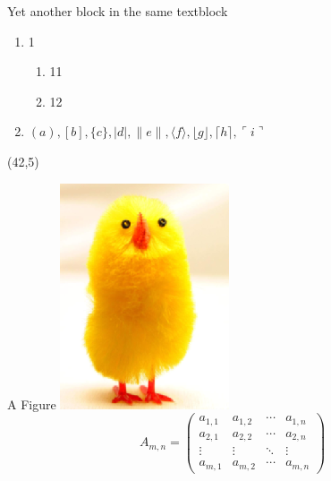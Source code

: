 \documentclass[14pt,final]{beamer}
\begin{document}
\begin{frame}{}
\begin{textblock}{19.3}
\begin{block}{Yet another block in the same textblock}
\begin{enumerate}
\item 1 \cite{latexcompanion}
\begin{enumerate}
\item 11
\item 12
\end{enumerate}
\item $( a ), [ b ], \{ c \}, | d |, \| e \|,
\langle f \rangle, \lfloor g \rfloor,
\lceil h \rceil, \ulcorner i \urcorner$
\end{enumerate}
\end{block}

\end{textblock}


\begin{textblock}{16.6}(42,5)
\begin{block}{A Figure}
\includegraphics[width=\textwidth]{figures/Chick1.png}
\begin{equation}
A_{m,n} = 
 \begin{pmatrix}
  a_{1,1} & a_{1,2} & \cdots & a_{1,n} \\
  a_{2,1} & a_{2,2} & \cdots & a_{2,n} \\
  \vdots  & \vdots  & \ddots & \vdots  \\
  a_{m,1} & a_{m,2} & \cdots & a_{m,n} 
 \end{pmatrix}
\end{equation}


\end{block}
\end{textblock}
\end{frame}
\end{document}
